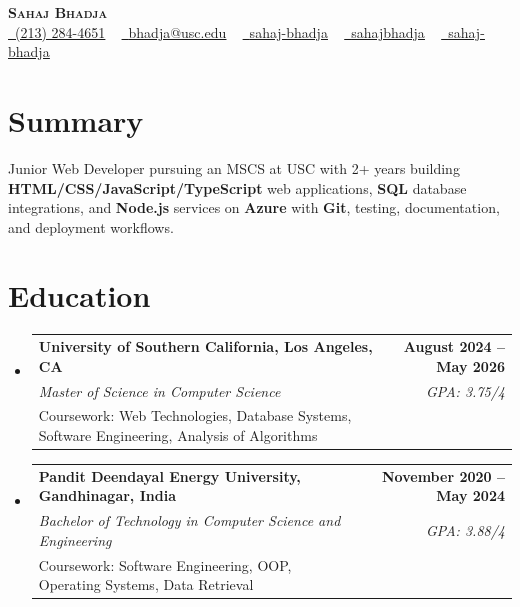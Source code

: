 \documentclass[letterpaper,10pt]{article}
\makeatletter
\newcommand{\resumeEduSubheading}[5]{\vspace{-1pt}\item\begin{tabular*}{1.0\textwidth}[t]{l@{\extracolsep{\fill}}r}\textbf{#1} & \textbf{\small #2} \\\textit{\small #3} & \textit{\small #4} \\\small #5 & \\\end{tabular*}\vspace{-4pt}}
\newcommand{\resumeSubHeadingListStart}{\begin{itemize}[leftmargin=0.0in, label={}]}
\newcommand{\resumeSubHeadingListEnd}{\end{itemize}}
\makeatother
\begin{document}
\begin{center}
{\Huge \scshape \textbf{Sahaj Bhadja}} \\ \vspace{1pt}
\small \href{tel:(213) 284-4651}{\faPhone\ \underline{(213) 284-4651}} ~ \href{mailto: bhadja@usc.edu}{\raisebox{-0.2\height}\faEnvelope\ \underline{bhadja@usc.edu}} ~
\href{https://www.linkedin.com/in/sahaj-bhadja/}{\raisebox{-0.2\height}\faLinkedin\ \underline{sahaj-bhadja}} ~ \href{https://github.com/SAHAJ-BHADJA}{\raisebox{-0.2\height}\faGithub\ \underline{sahajbhadja}} ~
\href{https://sahaj-bhadja.vercel.app/}{\raisebox{-0.2\height}\faGlobe\ \underline{sahaj-bhadja}}
\end{center}
\vspace{-16pt}
\section{Summary}
\begin{itemize}[leftmargin=0.15in, label={}]
\small{\item{Junior Web Developer pursuing an MSCS at USC with 2+ years building \textbf{HTML/CSS/JavaScript/TypeScript} web applications, \textbf{SQL} database integrations, and \textbf{Node.js} services on \textbf{Azure} with \textbf{Git}, testing, documentation, and deployment workflows.}}
\end{itemize}
\vspace{-6pt}
\section{Education}
\resumeSubHeadingListStart
\resumeEduSubheading{University of Southern California, Los Angeles, CA}{August 2024 -- May 2026}{Master of Science in Computer Science}{GPA: 3.75/4}{Coursework: Web Technologies, Database Systems, Software Engineering, Analysis of Algorithms}
\vspace{-9pt}
\resumeEduSubheading{Pandit Deendayal Energy University, Gandhinagar, India}{November 2020 -- May 2024}{Bachelor of Technology in Computer Science and Engineering}{GPA: 3.88/4}{Coursework: Software Engineering, OOP, Operating Systems, Data Retrieval}
\resumeSubHeadingListEnd
\vspace{-6pt}
\end{document}

